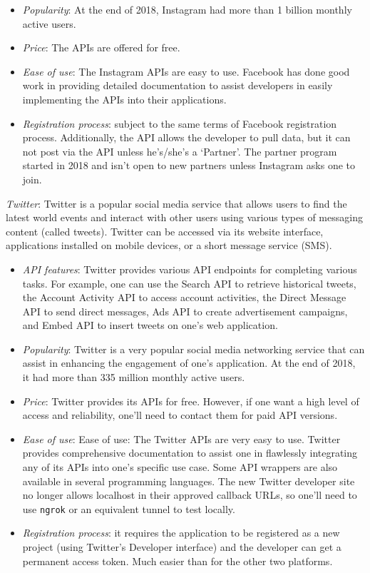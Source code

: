 \begin{enum-c}
\begin{itemize}
  accounts. With the Graph API, one can conveniently manage and publish media
  objects, discover other businesses, track mentions, analyze valuable metrics,
  moderate comments, and search hashtags.
\item \emph{Popularity}:
  At the end of 2018, Instagram had more than 1 billion monthly active users.
\item \emph{Price}:
  The APIs are offered for free.
\item \emph{Ease of use}:
  The Instagram APIs are easy to use. Facebook has done good
  work in providing detailed documentation to assist developers in easily
  implementing the APIs into their applications.
\item \emph{Registration process}: subject to the same terms of Facebook
  registration process. Additionally, the API allows the developer to pull data, but it can
  not post via the API unless he's/she's a `Partner'. The partner
 program started in 2018 and isn't open to new partners unless Instagram asks
 one to join.  
\end{itemize}
%
\item \emph{Twitter}:
Twitter is a popular social media service that allows users to find the latest
world events and interact with other users using various types of messaging
content (called tweets). Twitter can be accessed via its website interface,
applications installed on mobile devices, or a short message service (SMS).
\begin{itemize}
\item \emph{API features}:
  Twitter provides various API endpoints for completing various tasks. For example, one can use the Search API to retrieve historical tweets, the Account Activity API to access account activities, the Direct Message API to send direct messages, Ads API to create advertisement campaigns, and Embed API to insert tweets on one's web application.
\item \emph{Popularity}:
Twitter is a very popular social media networking service that can assist in enhancing the engagement of one's application. At the end of 2018, it had more than 335 million monthly active users.
\item \emph{Price}:
Twitter provides its APIs for free. However, if one want a high level of access and reliability, one’ll need to contact them for paid API versions.
\item \emph{Ease of use}:
Ease of use: The Twitter APIs are very easy to use. Twitter provides
comprehensive documentation to assist one in flawlessly integrating any of its
APIs into one's specific use case. Some API wrappers are also available in
several programming languages. The new Twitter developer site no longer allows
localhost in their approved callback URLs, so one’ll need to use \texttt{ngrok} or an equivalent tunnel to test locally.
\item \emph{Registration process}: it requires the application to be registered as a
  new project (using Twitter's Developer interface) and the developer can get a
  permanent access token. Much easier than for the other two platforms.
\end{itemize}
\end{enum-c}

